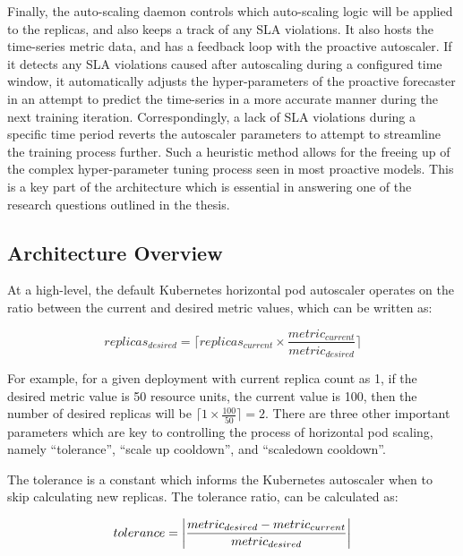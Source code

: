 Finally, the auto-scaling daemon controls which auto-scaling logic will be applied to the replicas, and also keeps a track of any SLA violations. It also hosts the time-series metric data, and has a feedback loop with the proactive autoscaler. If it detects any SLA violations caused after autoscaling during a configured time window, it automatically adjusts the hyper-parameters of the proactive forecaster in an attempt to predict the time-series in a more accurate manner during the next training iteration. Correspondingly, a lack of SLA violations during a specific time period reverts the autoscaler parameters to attempt to streamline the training process further. Such a heuristic method allows for the freeing up of the complex hyper-parameter tuning process seen in most proactive models. This is a key part of the architecture which is essential in answering one of the research questions outlined in the thesis.\par


\subsection{Architecture Overview}
\label{subsec:ch3-hybrid-arch}

At a high-level, the default Kubernetes horizontal pod autoscaler operates on the ratio between the current and desired metric values, which can be written as:

\[ replicas_{desired} = \lceil replicas_{current} \times \frac{metric_{current}}{metric_{desired}}\rceil\]

For example, for a given deployment with current replica count as 1, if the desired metric value is 50 resource units, the current value is 100, then the number of desired replicas will be $\lceil 1 \times \frac{100}{50}\rceil = 2$. There are three other important parameters which are key to controlling the process of horizontal pod scaling, namely ``tolerance'', ``scale up cooldown'', and ``scaledown cooldown''.\par

The tolerance is a constant which informs the Kubernetes autoscaler when to skip calculating new replicas. The tolerance ratio, can be calculated as:

\[ tolerance = \abs{ \frac{metric_{desired} - metric_{current}}{metric_{desired}} }\]

